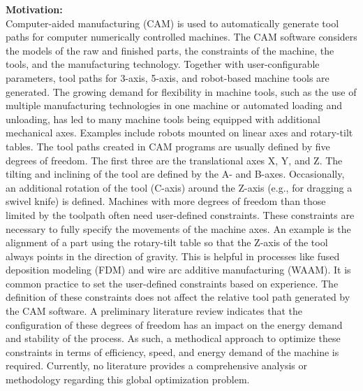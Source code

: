 \vspace{5mm}
\textbf{Motivation:}\\
Computer-aided manufacturing (CAM) is used to automatically generate tool paths for 
computer numerically controlled machines. The CAM software considers the models of the 
raw and finished parts, the constraints of the machine, the tools, and the manufacturing 
technology. Together with user-configurable parameters, tool paths for 3-axis, 5-axis, and 
robot-based machine tools are generated. The growing demand for flexibility in machine tools, 
such as the use of multiple manufacturing technologies in one machine or automated loading 
and unloading, has led to many machine tools being equipped with additional mechanical 
axes. Examples include robots mounted on linear axes and rotary-tilt tables.
The tool paths created in CAM programs are usually defined by five degrees of freedom. The 
first three are the translational axes X, Y, and Z. The tilting and inclining of the tool are defined 
by the A- and B-axes. Occasionally, an additional rotation of the tool (C-axis) around the Z-axis (e.g., for dragging a swivel knife) is defined. Machines with more degrees of freedom than 
those limited by the toolpath often need user-defined constraints. These constraints are 
necessary to fully specify the movements of the machine axes. An example is the alignment 
of a part using the rotary-tilt table so that the Z-axis of the tool always points in the direction of 
gravity. This is helpful in processes like fused deposition modeling (FDM) and wire arc additive 
manufacturing (WAAM).
It is common practice to set the user-defined constraints based on experience. The definition 
of these constraints does not affect the relative tool path generated by the CAM software. A 
preliminary literature review indicates that the configuration of these degrees of freedom has 
an impact on the energy demand and stability of the process. As such, a methodical approach to optimize these constraints in terms of 
efficiency, speed, and energy demand of the machine is required. Currently, no literature
provides a comprehensive analysis or methodology regarding this global optimization 
problem.

